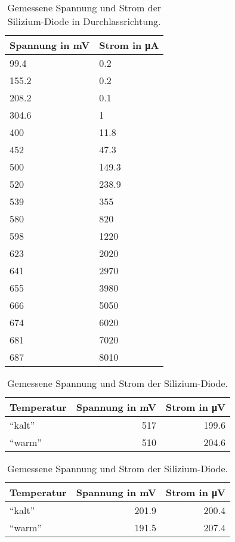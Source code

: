 \documentclass[
12pt,
a4paper,
bibliography=totocnumbered, %
BCOR=1cm, %
oneside, %
]{scrartcl}
\begin{document}
\begin{table}[H]
	\centering %
	\caption{Gemessene Spannung und Strom der Silizium-Diode in Durchlassrichtung.\label{tbl:SiDiode}}
	\begin{tabular}{ll}
		\toprule
		Spannung in \si{\milli\volt} & Strom in \si{\micro\ampere} \\
		\midrule
		\num{99,4}  & \num{0,2} \\
		\num{155,2}  & \num{0,2} \\
		\num{208,2}  & \num{0,1} \\
		\num{304,6}  & \num{1}  \\
		\num{400}  & \num{11,8}  \\
		\num{452}  & \num{47,3}  \\
		\num{500}  & \num{149,3} \\
		\num{520}  & \num{238,9} \\
		\num{539}  & \num{355} \\
		\num{580}  & \num{820} \\
		\num{598}  & \num{1220} \\
		\num{623}  & \num{2020} \\
		\num{641}  & \num{2970} \\
		\num{655}  & \num{3980} \\
		\num{666}  & \num{5050} \\
		\num{674}  & \num{6020} \\
		\num{681}  & \num{7020} \\
		\num{687}  & \num{8010} \\
		\bottomrule
	\end{tabular}
\end{table}

\begin{table}[H]
	\centering %
	\caption{Gemessene Spannung und Strom der Silizium-Diode.\label{tbl:TempSi}}
	\begin{tabular}{lrr}
		\toprule
		Temperatur & Spannung in \si{\milli\volt} & Strom in \si{\micro\volt} \\
		\midrule
		\enquote{kalt} & \num{517} & \num{199,6} \\
		\enquote{warm} & \num{510} & \num{204,6}\\
		\bottomrule
	\end{tabular}
\end{table}

\begin{table}[H]
	\centering %
	\caption{Gemessene Spannung und Strom der Silizium-Diode.\label{tbl:TempGe}}
	\begin{tabular}{lrr}
		\toprule
		Temperatur & Spannung in \si{\milli\volt} & Strom in \si{\micro\volt} \\
		\midrule
		\enquote{kalt} & \num{201,9} & \num{200,4} \\
		\enquote{warm} & \num{191,5} & \num{207,4} \\
		\bottomrule
	\end{tabular}
\end{table}
\end{document}
